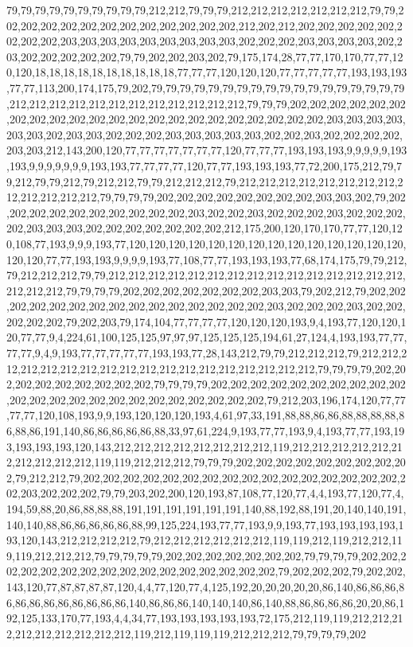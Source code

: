 79,79,79,79,79,79,79,79,79,79,212,212,79,79,79,212,212,212,212,212,212,212,79,79,202,202,202,202,202,202,202,202,202,202,202,202,212,202,212,202,202,202,202,202,202,202,202,203,203,203,203,203,203,203,203,203,202,202,202,203,203,203,203,202,203,202,202,202,202,202,79,79,202,202,203,202,79,175,174,28,77,77,170,170,77,77,120,120,18,18,18,18,18,18,18,18,18,18,77,77,77,120,120,120,77,77,77,77,77,193,193,193,77,77,113,200,174,175,79,202,79,79,79,79,79,79,79,79,79,79,79,79,79,79,79,79,79,79,212,212,212,212,212,212,212,212,212,212,212,212,79,79,79,202,202,202,202,202,202,202,202,202,202,202,202,202,202,202,202,202,202,202,202,202,202,203,203,203,203,203,203,202,203,203,202,202,202,203,203,203,203,203,202,202,203,202,202,202,202,203,203,212,143,200,120,77,77,77,77,77,77,77,120,77,77,77,193,193,193,9,9,9,9,9,193,193,9,9,9,9,9,9,9,193,193,77,77,77,77,120,77,77,193,193,193,77,72,200,175,212,79,79,212,79,79,212,79,212,212,79,79,212,212,212,79,212,212,212,212,212,212,212,212,212,212,212,212,212,79,79,79,79,202,202,202,202,202,202,202,202,203,203,202,79,202,202,202,202,202,202,202,202,202,202,203,202,202,203,202,202,202,203,202,202,202,202,203,203,203,202,202,202,202,202,202,202,212,175,200,120,170,170,77,77,120,120,108,77,193,9,9,9,193,77,120,120,120,120,120,120,120,120,120,120,120,120,120,120,120,120,77,77,193,193,9,9,9,9,193,77,108,77,77,193,193,193,77,68,174,175,79,79,212,79,212,212,212,79,79,212,212,212,212,212,212,212,212,212,212,212,212,212,212,212,212,212,212,79,79,79,79,202,202,202,202,202,202,202,203,203,79,202,212,79,202,202,202,202,202,202,202,202,202,202,202,202,202,202,202,203,202,202,202,203,202,202,202,202,202,79,202,203,79,174,104,77,77,77,77,120,120,120,193,9,4,193,77,120,120,120,77,77,9,4,224,61,100,125,125,97,97,97,125,125,125,194,61,27,124,4,193,193,77,77,77,77,9,4,9,193,77,77,77,77,77,193,193,77,28,143,212,79,79,212,212,212,79,212,212,212,212,212,212,212,212,212,212,212,212,212,212,212,212,212,212,79,79,79,79,202,202,202,202,202,202,202,202,202,79,79,79,79,202,202,202,202,202,202,202,202,202,202,202,202,202,202,202,202,202,202,202,202,202,202,202,79,212,203,196,174,120,77,77,77,77,120,108,193,9,9,193,120,120,120,193,4,61,97,33,191,88,88,86,86,88,88,88,88,86,88,86,191,140,86,86,86,86,86,88,33,97,61,224,9,193,77,77,193,9,4,193,77,77,193,193,193,193,193,120,143,212,212,212,212,212,212,212,212,119,212,212,212,212,212,212,212,212,212,212,119,119,212,212,212,79,79,79,202,202,202,202,202,202,202,202,202,79,212,212,79,202,202,202,202,202,202,202,202,202,202,202,202,202,202,202,202,202,203,202,202,202,79,79,203,202,200,120,193,87,108,77,120,77,4,4,193,77,120,77,4,194,59,88,20,86,88,88,88,191,191,191,191,191,191,140,88,192,88,191,20,140,140,191,140,140,88,86,86,86,86,86,88,99,125,224,193,77,77,193,9,9,193,77,193,193,193,193,193,120,143,212,212,212,212,79,212,212,212,212,212,212,119,119,212,119,212,212,119,119,212,212,212,79,79,79,79,79,202,202,202,202,202,202,202,79,79,79,79,202,202,202,202,202,202,202,202,202,202,202,202,202,202,202,202,79,202,202,202,79,202,202,143,120,77,87,87,87,87,120,4,4,77,120,77,4,125,192,20,20,20,20,20,86,140,86,86,86,86,86,86,86,86,86,86,86,86,140,86,86,86,140,140,140,86,140,88,86,86,86,86,20,20,86,192,125,133,170,77,193,4,4,34,77,193,193,193,193,193,72,175,212,119,119,212,212,212,212,212,212,212,212,212,119,212,119,119,119,212,212,212,79,79,79,79,202